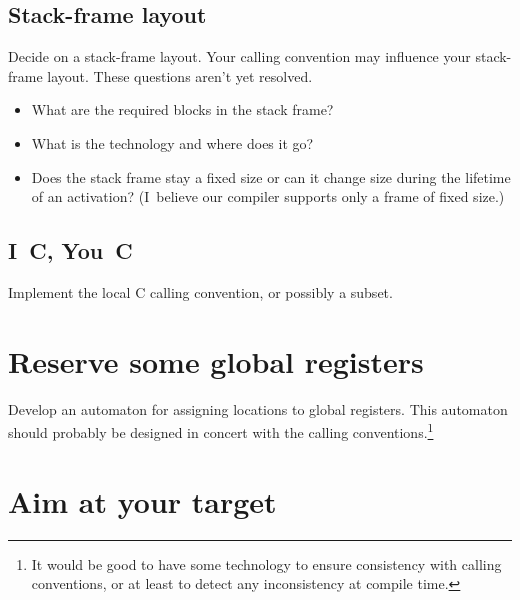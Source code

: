 \documentclass[12pt]{article}
\begin{document}
\subsection{Stack-frame layout}

Decide on a stack-frame layout.
Your calling convention may influence your stack-frame layout.
These questions aren't yet resolved.
\begin{itemize}
\item
What are the required blocks in the stack frame?
\item
What is the technology and where does it go?
\item
Does the stack frame stay a fixed size or can it change size during
the lifetime of an activation? 
(I~believe our compiler supports only a frame of fixed size.)
\end{itemize}


\subsection{I~C, You~C}

Implement the local C calling convention, or possibly a subset.


\section{Reserve some global registers}

Develop an automaton for assigning locations to global registers.
This automaton should probably be designed in concert with the calling
conventions.\footnote
{It would be good to have some technology to ensure consistency with
calling conventions, or at least to detect any inconsistency at
compile time.}


\section{Aim at your target}
\end{document}
